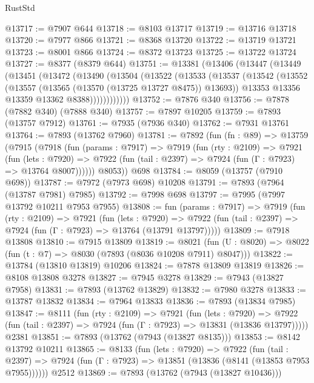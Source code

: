 \begin{lexlean}{RustStd}
\begin{coremodule}
{\begin{coremodule}
{{{{{{{{{{{{{{{{{{{{{{{{{{{{{{{{{{{{{{{{{{{{{{{{{{@13717 := @7907 @644
@13718 := @8103 @13717
@13719 := @13716 @13718
@13720 := @7977 @866
@13721 := @8368 @13720
@13722 := @13719 @13721
@13723 := @8001 @866
@13724 := @8372 @13723
@13725 := @13722 @13724
@13727 := @8377 (@8379 @644)
@13751 := @13381
    (@13406
      (@13447
        (@13449
          (@13451
            (@13472
              (@13490
                (@13504
                  (@13522
                    (@13533
                      (@13537
                        (@13542
                          (@13552
                            (@13557 (@13565 (@13570 (@13725 @13727 @8475)) @13693))
                            @13353
                            @13356
                            @13359
                            @13362
                            @8388))))))))))))
@13752 := @7876 @340
@13756 := @7878 (@7882 @340) (@7888 @340)
@13757 := @7897 @10205
@13759 := @7893 (@13757 @7912)
@13761 := @7935 (@7936 @340)
@13762 := @7931 @13761
@13764 := @7893 (@13762 @7960)
@13781 := @7892
    (fun (fn : @89) =>
    @13759
      (@7915
        (@7918
          (fun (params : @7917) =>
          @7919
            (fun (rty : @2109) =>
            @7921
              (fun (lets : @7920) =>
              @7922 (fun (tail : @2397) => @7924 (fun (Γ : @7923) => @13764 @8007))))))
        @8053))
    @698
@13784 := @8059 (@13757 (@7910 @698))
@13787 := @7972 (@7973 @698) @10208
@13791 := @7893 (@7964 (@13787 @7981) @7985)
@13792 := @7998 @698
@13797 := @7995 (@7997 @13792 @10211 @7953 @7955)
@13808 := fun (params : @7917) =>
  @7919
    (fun (rty : @2109) =>
    @7921
      (fun (lets : @7920) =>
      @7922 (fun (tail : @2397) => @7924 (fun (Γ : @7923) => @13764 (@13791 @13797)))))
@13809 := @7918 @13808
@13810 := @7915 @13809
@13819 := @8021
    (fun (U : @8020) => @8022 (fun (t : @7) => @8030 (@7893 (@8036 @10208 @7911) @8047)))
@13822 := @13784 (@13810 @13819) @10206
@13824 := @7878 @13809 @13819
@13826 := @8108 @13808 @3278
@13827 := @7945 @3278
@13829 := @7943 (@13827 @7958)
@13831 := @7893 (@13762 @13829)
@13832 := @7980 @3278
@13833 := @13787 @13832
@13834 := @7964 @13833
@13836 := @7893 (@13834 @7985)
@13847 := @8111
    (fun (rty : @2109) =>
    @7921
      (fun (lets : @7920) =>
      @7922 (fun (tail : @2397) => @7924 (fun (Γ : @7923) => @13831 (@13836 @13797)))))
    @2381
@13851 := @7893 (@13762 (@7943 (@13827 @8135)))
@13853 := @8142 @13792 @10211
@13865 := @8133
    (fun (lets : @7920) =>
    @7922
      (fun (tail : @2397) =>
      @7924 (fun (Γ : @7923) => @13851 (@13836 (@8141 (@13853 @7953 @7955))))))
    @2512
@13869 := @7893 (@13762 (@7943 (@13827 @10436)))
}}}}}}}}}}}}}}}}}}}}}}}}}}}}}}}}}}}}}}}}}}}}}}}}}}
\end{coremodule}}
\end{coremodule}
\end{lexlean}

